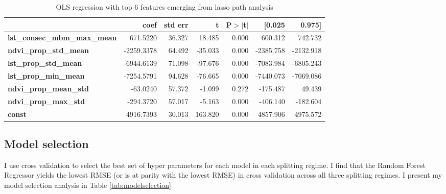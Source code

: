 \documentclass{article}
\begin{document}
\begin{table}[!htbp]
  \small
  \begin{center}
    \begin{tabular}{lrrrrrr}
    & \textbf{coef} & \textbf{std err} & \textbf{t} & \textbf{P$> |$t$|$} & \textbf{[0.025} & \textbf{0.975]}  \\
    \midrule
    \textbf{lst\_consec\_mbm\_max\_mean} &     671.5220  &       36.327     &    18.485  &         0.000        &      600.312    &      742.732     \\
    \textbf{ndvi\_prop\_std\_mean}       &   -2259.3378  &       64.492     &   -35.033  &         0.000        &    -2385.758    &    -2132.918     \\
    \textbf{lst\_prop\_std\_mean}        &   -6944.6139  &       71.098     &   -97.676  &         0.000        &    -7083.984    &    -6805.243     \\
    \textbf{lst\_prop\_min\_mean}        &   -7254.5791  &       94.628     &   -76.665  &         0.000        &    -7440.073    &    -7069.086     \\
    \textbf{ndvi\_prop\_mean\_std}       &     -63.0240  &       57.372     &    -1.099  &         0.272        &     -175.487    &       49.439     \\
    \textbf{ndvi\_prop\_max\_std}        &    -294.3720  &       57.017     &    -5.163  &         0.000        &     -406.140    &     -182.604     \\
    \textbf{const}                       &    4916.7393  &       30.013     &   163.820  &         0.000        &     4857.906    &     4975.572     \\
    \bottomrule
    \end{tabular}
    \end{center}
    \caption{\label{tab:ols} OLS regression with top 6 features emerging from lasso path analysis}
\end{table}

\subsection{Model selection}
I use cross validation to select the best set of hyper parameters for each model in each splitting regime. I find that the Random Forest Regressor yields the lowest RMSE (or is at parity with the lowest RMSE) in cross validation across all three splitting regimes. I present my model selection analysis in Table \ref{tab:modelselection}
\end{document}
